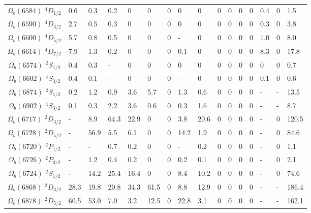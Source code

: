 \begin{tabular}{c |  p{0.58cm}  p{0.58cm}  p{0.58cm}  p{0.58cm}  p{0.58cm}  p{0.58cm}  p{0.58cm}  p{0.58cm}  p{0.58cm}  p{0.58cm}  p{0.58cm}  p{0.58cm}  p{0.58cm}  p{0.58cm}p{0.75cm}}
$\Omega_b(6584)$ $^{4}D_{1/2}$&0.6   &0.3   &0.2   &$0$   &$0$   &$0$   &$0$   &$0$   &$0$   &$0$   &$0$   &$0$   &0.4   &$0$   &1.5  \\
$\Omega_b(6590)$ $^{4}D_{3/2}$&2.7   &0.5   &0.3   &$0$   &$0$   &$0$   &$0$   &$0$   &$0$   &$0$   &$0$   &$0$   &0.3   &$0$   &3.8  \\
$\Omega_b(6600)$ $^{4}D_{5/2}$&5.7   &0.8   &0.5   &$0$   &$0$   &$0$   &-   &$0$   &$0$   &$0$   &$0$   &$0$   &1.0   &$0$   &8.0  \\
$\Omega_b(6614)$ $^{4}D_{7/2}$&7.9   &1.3   &0.2   &$0$   &$0$   &$0$   &0.1   &$0$   &$0$   &$0$   &$0$   &$0$   &8.3   &$0$   &17.8  \\
$\Omega_b(6574)$ $^{2}S_{1/2}$&0.4   &0.3   &-   &$0$   &$0$   &$0$   &$0$   &$0$   &$0$   &$0$   &$0$   &$0$   &$0$   &$0$   &0.7  \\
$\Omega_b(6602)$ $^{4}S_{3/2}$&0.4   &0.1   &-   &$0$   &$0$   &$0$   &-   &$0$   &$0$   &$0$   &$0$   &$0$   &0.1   &$0$   &0.6  \\
$\Omega_b(6874)$ $^{2}S_{1/2}$&0.2   &1.2   &0.9   &3.6   &5.7   &$0$   &1.3   &0.6   &$0$   &$0$   &$0$   &$0$   &-   &-   &13.5  \\
$\Omega_b(6902)$ $^{4}S_{3/2}$&0.1   &0.3   &2.2   &3.6   &0.6   &$0$   &0.3   &1.6   &$0$   &$0$   &$0$   &$0$   &-   &-   &8.7  \\
$\Omega_b(6717)$ $^{2}D_{3/2}$&-   &8.9   &64.3   &22.9   &$0$   &$0$   &3.8   &20.6   &$0$   &$0$   &$0$   &$0$   &-   &$0$   &120.5  \\
$\Omega_b(6728)$ $^{2}D_{5/2}$&-   &56.9   &5.5   &6.1   &$0$   &$0$   &14.2   &1.9   &$0$   &$0$   &$0$   &$0$   &-   &$0$   &84.6  \\
$\Omega_b(6720)$ $^{2}P_{1/2}$&-   &-   &0.7   &0.2   &$0$   &$0$   &-   &0.2   &$0$   &$0$   &$0$   &$0$   &-   &$0$   &1.1  \\
$\Omega_b(6726)$ $^{2}P_{3/2}$&-   &1.2   &0.4   &0.2   &$0$   &$0$   &0.2   &0.1   &$0$   &$0$   &$0$   &$0$   &-   &$0$   &2.1  \\
$\Omega_b(6724)$ $^{2}S_{1/2}$&-   &14.2   &25.4   &16.4   &$0$   &$0$   &8.4   &10.2   &$0$   &$0$   &$0$   &$0$   &-   &$0$   &74.6  \\
$\Omega_b(6868)$ $^{2}D_{3/2}$&28.3   &19.8   &20.8   &34.3   &61.5   &$0$   &8.8   &12.9   &$0$   &$0$   &$0$   &$0$   &-   &-   &186.4  \\
$\Omega_b(6878)$ $^{2}D_{5/2}$&60.5   &53.0   &7.0   &3.2   &12.5   &$0$   &22.8   &3.1   &$0$   &$0$   &$0$   &$0$   &-   &-   &162.1  \\

\end{tabular}
